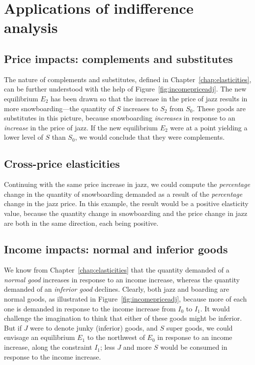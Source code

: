 \section{Applications of indifference analysis}\label{sec:ch6sec4}

\subsection*{Price impacts: complements and substitutes}

The nature of complements and substitutes, defined in Chapter~\ref{chap:elasticities}, can be further understood with the help of Figure~\ref{fig:incomepriceadj}. The new equilibrium $E_2$ has been drawn so that the increase in the price of jazz results in more snowboarding---the quantity of $S$ increases to $S_2$ from $S_0$. These goods are substitutes in this picture, because snowboarding \textit{increases} in response to an \textit{increase} in the price of jazz. If the new equilibrium $E_2$ were at a point yielding a lower level of $S$ than $S_0$, we would conclude that they were complements.  

\subsection*{Cross-price elasticities}

Continuing with the same price increase in jazz, we could compute the \textit{percentage} change in the quantity of snowboarding demanded as a result of the \textit{percentage} change in the jazz price. In this example, the result would be a positive elasticity value, because the quantity change in snowboarding and the price change in jazz are both in the same direction, each being positive.


\subsection*{Income impacts: normal and inferior goods}

We know from Chapter~\ref{chap:elasticities} that the quantity demanded of a \textit{normal good} increases in response to an income increase, whereas the quantity demanded of an \textit{inferior good} declines. Clearly, both jazz and boarding are normal goods, as illustrated in Figure~\ref{fig:incomepriceadj}, because more of each one is demanded in response to the income increase from $I_0$ to $I_1$. It would challenge the imagination to think that either of these goods might be inferior. But if $J$ were to denote junky (inferior) goods, and $S$ super goods, we could envisage an equilibrium $E_1$ to the northwest of $E_0$ in response to an income increase, along the constraint $I_1$; less $J$ and more $S$ would be consumed in response to the income increase.

